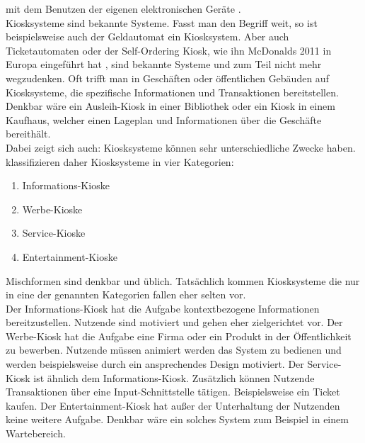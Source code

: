 mit dem Benutzen der eigenen elektronischen Geräte \cite{multimediale}.\\
Kiosksysteme sind bekannte Systeme. Fasst man den Begriff weit, so ist beispielsweise auch der Geldautomat ein Kiosksystem.
Aber auch Ticketautomaten oder der Self-Ordering Kiosk, wie ihn McDonalds 2011 in Europa 
eingeführt hat \cite{mcdonalds}, sind bekannte Systeme und zum Teil nicht mehr wegzudenken. Oft trifft man in 
Geschäften oder öffentlichen Gebäuden auf Kiosksysteme, die spezifische Informationen und Transaktionen 
bereitstellen. Denkbar wäre ein Ausleih-Kiosk in einer Bibliothek oder ein Kiosk in einem Kaufhaus, welcher einen
Lageplan und Informationen über die Geschäfte bereithält.\\
Dabei zeigt sich auch: Kiosksysteme können sehr unterschiedliche Zwecke haben.  klassifizieren daher
Kiosksysteme in vier Kategorien:

\begin{enumerate}
\item Informations-Kioske
\item Werbe-Kioske
\item Service-Kioske
\item Entertainment-Kioske
\end{enumerate}

Mischformen sind denkbar und üblich. Tatsächlich kommen Kiosksysteme die nur in eine der genannten Kategorien fallen
eher selten vor.\\
Der Informations-Kiosk hat die Aufgabe kontextbezogene Informationen bereitzustellen. Nutzende sind motiviert und
gehen eher zielgerichtet vor. 
Der Werbe-Kiosk hat die Aufgabe eine Firma oder ein Produkt in der Öffentlichkeit zu
bewerben. Nutzende müssen animiert werden das System zu bedienen und werden beispielsweise durch ein ansprechendes
Design motiviert.
Der Service-Kiosk ist ähnlich dem Informations-Kiosk. Zusätzlich können Nutzende Transaktionen über eine 
Input-Schnittstelle tätigen. Beispielsweise ein Ticket kaufen.
Der Entertainment-Kiosk hat außer der Unterhaltung der Nutzenden keine weitere Aufgabe. Denkbar wäre ein solches
System zum Beispiel in einem Wartebereich. 